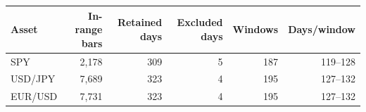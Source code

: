 \begin{tabular}{lrrrrr}
\toprule
Asset & In-range bars & Retained days & Excluded days & Windows & Days/window \\
\midrule
SPY & 2,178 & 309 & 5 & 187 & 119--128 \\
USD/JPY & 7,689 & 323 & 4 & 195 & 127--132 \\
EUR/USD & 7,731 & 323 & 4 & 195 & 127--132 \\
\bottomrule
\end{tabular}
